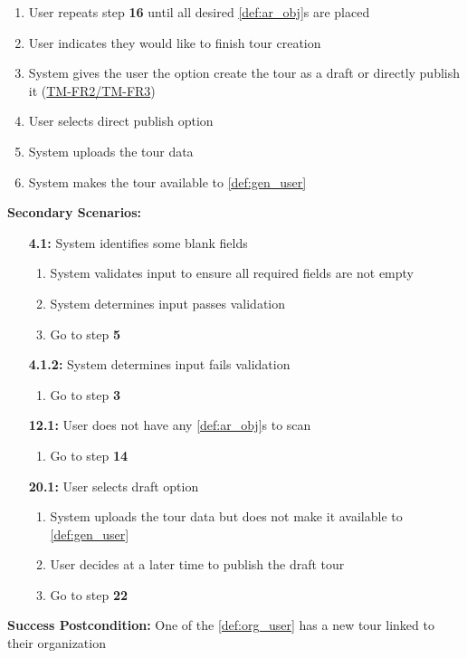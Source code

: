 \documentclass{article}
\begin{document}
\begin{enumerate}[label=\textbf{UC\arabic*}]
\begin{enumerate}[label=\textbf{\arabic*.}]
              \item User repeats step \textbf{16} until all desired \ref{def:ar_obj}s are placed
              \item User indicates they would like to finish tour creation
              \item System gives the user the option create the tour as a draft or directly publish it (\hyperref[ssub:tour_management]{TM-FR2/TM-FR3})
              \item User selects direct publish option
              \item System uploads the tour data
              \item System makes the tour available to \ref{def:gen_user}
          \end{enumerate}

          \textbf{Secondary Scenarios:}
          \begin{itemize}
              \item[{\bf 4.1:}] System identifies some blank fields
                  \begin{enumerate}[label=\textbf{\arabic*.}]
                      \item System validates input to ensure all required fields are not empty
                      \item System determines input passes validation
                      \item Go to step \textbf{5}
                  \end{enumerate}
              \item[{\bf 4.1.2:}] System determines input fails validation
                  \begin{enumerate}[label=\textbf{\arabic*.}]
                      \item Go to step \textbf{3}
                  \end{enumerate}
              \item[{\bf 12.1:}] User does not have any \ref{def:ar_obj}s to scan
                  \begin{enumerate}[label=\textbf{\arabic*.}]
                      \item Go to step \textbf{14}
                  \end{enumerate}
              \item[{\bf 20.1:}] User selects draft option
                  \begin{enumerate}[label=\textbf{\arabic*.}]
                      \item System uploads the tour data but does not make it available to \ref{def:gen_user}
                      \item User decides at a later time to publish the draft tour
                      \item Go to step \textbf{22}
                  \end{enumerate}
          \end{itemize}
          \textbf{Success Postcondition:} One of the \ref{def:org_user} has a new tour linked to their organization


\end{enumerate}
\end{document}
